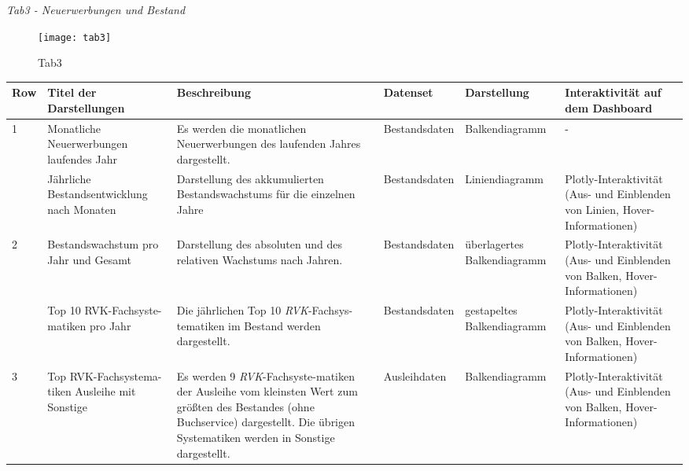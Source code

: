 \clearpage
    
    

    \recalctypearea
    \textit{Tab3 - Neuerwerbungen und Bestand}
    \begin{figure}[H]
        \centering
            \texttt{[image: tab3]}
            \caption{Tab3}
            \label{fig:tab3}
    \end{figure}

    \recalctypearea 
    \begingroup
    \setlength{\tabcolsep}{12pt} %
    \renewcommand{\arraystretch}{1.0} 
    \begin{table}[H]
        \LARGE
        \centering
        \begin{adjustbox}{max width=\textwidth}
        \begin{tabular}{p{}p{}p{}p{}p{}p{}}
           \toprule
           Row        &Titel der Darstellungen&Beschreibung &Datenset &Darstellung &Interaktivität auf dem Dashboard\\
           \midrule
            1           &Monatliche Neuerwerbungen laufendes Jahr&Es werden die monatlichen Neuerwerbungen des laufenden Jahres dargestellt.&Bestandsdaten&Balkendiagramm&-\\
                        &Jährliche Bestandsentwicklung nach Monaten&Darstellung des akkumulierten Bestandswachstums für die einzelnen Jahre&Bestandsdaten&Liniendiagramm    &Plotly-Interaktivität (Aus- und Einblenden von Linien, Hover-Informationen)\\          
            \midrule
            2           &Bestandswachstum pro Jahr und Gesamt&Darstellung des absoluten und des relativen Wachstums nach Jahren.&Bestandsdaten&überlagertes Balkendiagramm&Plotly-Interaktivität (Aus- und Einblenden von Balken, Hover-Informationen)\\
                        &Top 10 RVK-Fachsyste-matiken pro Jahr&Die jährlichen Top 10 \textit{\acrshort{RVK}}-Fachsys-tematiken im Bestand werden dargestellt.&Bestandsdaten    &gestapeltes Balkendiagramm&Plotly-Interaktivität (Aus- und Einblenden von Balken, Hover-Informationen)\\
            \midrule
            3           &Top RVK-Fachsystema-tiken Ausleihe mit Sonstige&Es werden 9 \textit{\acrshort{RVK}}-Fachsyste-matiken der Ausleihe vom kleinsten Wert zum größten des Bestandes (ohne Buchservice) dargestellt. Die übrigen Systematiken werden in Sonstige dargestellt.&Ausleihdaten&Balkendiagramm&Plotly-Interaktivität (Aus- und Einblenden von Balken, Hover-Informationen)\\

\end{tabular}
\end{adjustbox}
\end{table}
